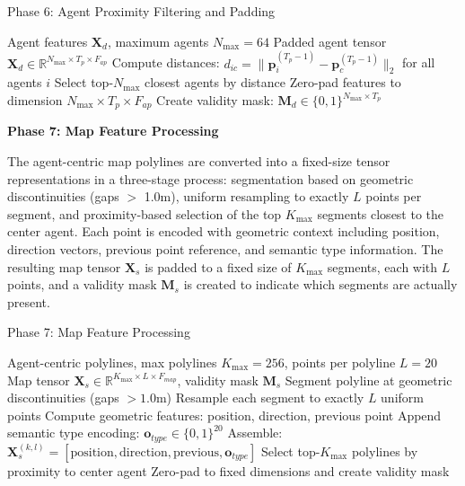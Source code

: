 \begin{algorithm}[H]
\caption{Phase 6: Agent Proximity Filtering and Padding}
\label{alg:phase6_proximity}
\begin{algorithmic}[1]
\REQUIRE Agent features \(\boldsymbol{X}_d\), maximum agents \(N_{\max} = 64\)
\ENSURE Padded agent tensor \(\boldsymbol{X}_d \in \mathbb{R}^{N_{\max} \times T_p \times F_{ap}}\)
    \STATE Compute distances: \(d_{ic} = \|\boldsymbol{p}_i^{(T_p-1)} - \boldsymbol{p}_c^{(T_p-1)}\|_2\) for all agents \(i\)
    \STATE Select top-\(N_{\max}\) closest agents by distance
    \STATE Zero-pad features to dimension \(N_{\max} \times T_p \times F_{ap}\)
    \STATE Create validity mask: \(\boldsymbol{M}_d \in \{0,1\}^{N_{\max} \times T_p}\)
\ENDFOR
\end{algorithmic}
\end{algorithm}

\textbf{Phase 7: Map Feature Processing}

The agent-centric map polylines are converted into a fixed-size tensor representations in a three-stage process: segmentation based on geometric discontinuities (gaps \(>\) 1.0m), uniform resampling to exactly \(L\) points per segment, and proximity-based selection of the top \(K_{\max}\) segments closest to the center agent. Each point is encoded with geometric context including position, direction vectors, previous point reference, and semantic type information. The resulting map tensor \(\boldsymbol{X}_s\) is padded to a fixed size of \(K_{\max}\) segments, each with \(L\) points, and a validity mask \(\boldsymbol{M}_s\) is created to indicate which segments are actually present.

\begin{algorithm}[H]
\caption{Phase 7: Map Feature Processing}
\label{alg:phase7_map_features}
\begin{algorithmic}[1]
\REQUIRE Agent-centric polylines, max polylines \(K_{\max} = 256\), points per polyline \(L = 20\)
\ENSURE Map tensor \(\boldsymbol{X}_s \in \mathbb{R}^{K_{\max} \times L \times F_{map}}\), validity mask \(\boldsymbol{M}_s\)
    \STATE Segment polyline at geometric discontinuities (gaps \(> 1.0\)m)
    \STATE Resample each segment to exactly \(L\) uniform points
    \STATE Compute geometric features: position, direction, previous point
    \STATE Append semantic type encoding: \(\boldsymbol{o}_{type} \in \{0,1\}^{20}\)
    \STATE Assemble: \(\boldsymbol{X}_s^{(k,l)} = [\text{position}, \text{direction}, \text{previous}, \boldsymbol{o}_{type}]\)
\ENDFOR
\STATE Select top-\(K_{\max}\) polylines by proximity to center agent
\STATE Zero-pad to fixed dimensions and create validity mask
\end{algorithmic}
\end{algorithm}

